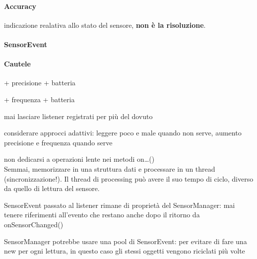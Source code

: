 \documentclass[10pt]{book}
\begin{document}
\paragraph{Accuracy} indicazione realativa allo stato del sensore, \textbf{non è la risoluzione}.
\paragraph{SensorEvent}
\paragraph{Cautele}
\begin{list}{}{}
	\item + precisione + batteria
	\item + frequenza + batteria
	\item mai lasciare listener registrati per più del dovuto
	\item considerare approcci adattivi: leggere poco e male quando non serve, aumento precisione e frequenza quando serve
	\item non dedicarsi a operazioni lente nei metodi on\ldots()\\
	Semmai, memorizzare in una struttura dati e processare in un thread (sincronizzazione!). Il thread di processing può avere il suo tempo di ciclo, diverso da quello di lettura del sensore.
	\item SensorEvent passato al listener rimane di proprietà del SensorManager: mai tenere riferimenti all'evento che restano anche dopo il ritorno da onSensorChanged()
	\item SensorManager potrebbe usare una pool di SensorEvent: per evitare di fare una new per ogni lettura, in questo caso gli stessi oggetti vengono riciclati più volte
\end{list}
\end{document}
